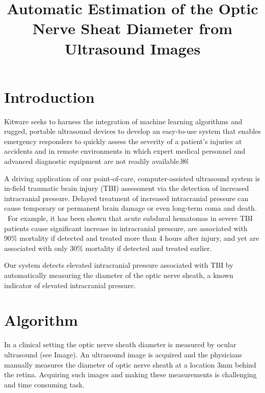 \documentclass{llncs}
\begin{document}
\title{Automatic Estimation of the Optic Nerve Sheat Diameter from Ultrasound Images}
%
%
\author{}

%
\authorrunning{} %
%
\tocauthor{}
%

\maketitle              %

\begin{abstract}
\end{abstract}
%
\section{Introduction}
Kitware seeks to harness the integration of machine learning algorithms and
rugged, portable ultrasound devices to develop an easy-to-use system that
enables emergency responders to quickly assess the severity of a patient's
injuries at accidents and in remote environments in which expert medical
personnel and advanced diagnostic equipment are not readily available.￼

A driving application of our point-of-care, computer-assisted ultrasound system
is in-field traumatic brain injury (TBI) assessment via the detection of
increased intracranial pressure. Delayed treatment of increased intracranial
pressure can cause temporary or permanent brain damage or even long-term coma
and death.  For example, it has been shown that acute subdural hematomas in
severe TBI patients cause significant increase in intracranial pressure, are
associated with 90\% mortality if detected and treated more than 4 hours after
injury, and yet are associated with only 30\% mortality if detected and treated
earlier.

Our system detects elevated intracranial pressure associated with TBI by
automatically measuring the diameter of the optic nerve sheath, a known
indicator of elevated intracranial pressure.  

\section{Algorithm}
In a clinical setting the optic nerve sheath diameter is measured by ocular
ultrasound (see Image). An ultrasound image is acquired and the physicians
manually measures the diameter of optic nerve sheath at a location 3mm behind
the retina. Acquiring such images and making these measurements is challenging
and time consuming task.
\end{document}
